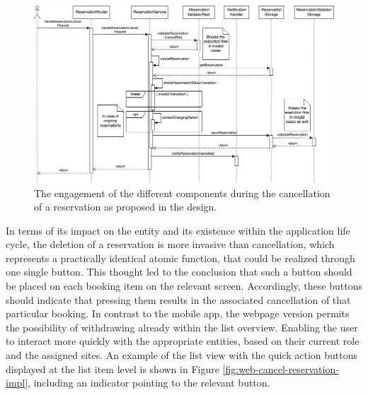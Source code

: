 \newpage

\begin{figure}[h]
    \centering
    \includegraphics[scale=0.4]{resources/images/main/6_implementation/processes/ReservationCancel.png}
    \caption{The engagement of the different components during the cancellation of a reservation as proposed in the design.}
    \label{fig:cancel-reservation-seqflow}
\end{figure}

\noindent In terms of its impact on the entity and its existence within the application life cycle, the deletion of a reservation is more invasive than cancellation, which represents a practically identical atomic function, that could be realized through one single button. 
This thought led to the conclusion that such a button should be placed on each booking item on the relevant screen. Accordingly, these buttons should indicate that pressing them results in the associated cancellation of that particular booking.
In contrast to the mobile app, the webpage version permits the possibility of withdrawing already within the list overview. Enabling the user to interact more quickly with the appropriate entities, based on their current role and the assigned sites.
An example of the list view with the quick action buttons displayed at the list item level is shown in Figure \ref{fig:web-cancel-reservation-impl}, including an indicator pointing to the relevant button.

